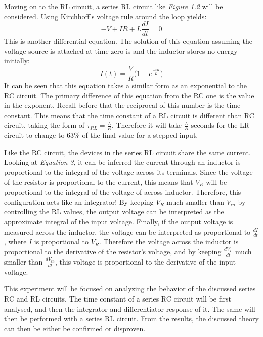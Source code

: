 \documentclass[12pt]{article}
\begin{document}
%
Moving on to the RL circuit, a series RL circuit like \textit{Figure 1.2} will be considered. Using Kirchhoff's voltage rule around the loop yields:
\begin{equation}
-V + IR + L\frac{dI}{dt}= 0
\end{equation}
This is another differential equation. The solution of this equation assuming the voltage source is attached at time zero is and the inductor stores no energy initially:
\begin{equation}
I(t) = \frac{V}{R} \Big( 1-e^\frac{-tR}{L}\Big)
\end{equation}
It can be seen that this equation takes a similar form as an exponential to the RC circuit. The primary difference of this equation from the RC one is the value in the exponent. Recall before that the reciprocal of this number is the time constant. This means that the time constant of a  RL circuit is different than RC circuit, taking the form of $\tau_{RL}=\frac{L}{R}$. Therefore it will take $\frac{L}{R}$ seconds for the LR circuit to change to 63\% of the final value for a stepped input.\par\vspace{12pt}
%
Like the RC circuit, the devices in the series RL circuit share the same current. Looking at \textit{Equation 3}, it can be inferred the current through an inductor is proportional to the integral of the voltage across its terminals. Since the voltage of the resistor is proportional to the current, this means that $V_R$ will be proportional to the integral of the voltage of across inductor. Therefore, this configuration acts like an integrator!  By keeping $V_R$ much smaller than $V_{in}$ by controlling the RL values, the output voltage can be interpreted as the approximate integral of the input voltage. Finally, if the output voltage is measured across the inductor, the voltage can be interpreted as proportional to $\frac{dI}{dt}$, where $I$ is proportional to $V_R$. Therefore the voltage across the inductor is proportional to the derivative of the resistor's voltage, and by keeping $\frac{dV_L}{dt}$ much smaller than 
$\frac{dV_{in}}{dt}$, this voltage is proportional to the derivative of the input voltage.\par\vspace{12pt}
%
This experiment will be focused on analyzing the behavior of the discussed series RC and RL circuits. The time constant of a series RC circuit will be first analysed, and then the integrator and differentiator response of it. The same will then be performed with a series RL circuit. From the results, the discussed theory can then be either be confirmed or disproven.
\pagebreak
\end{document}
